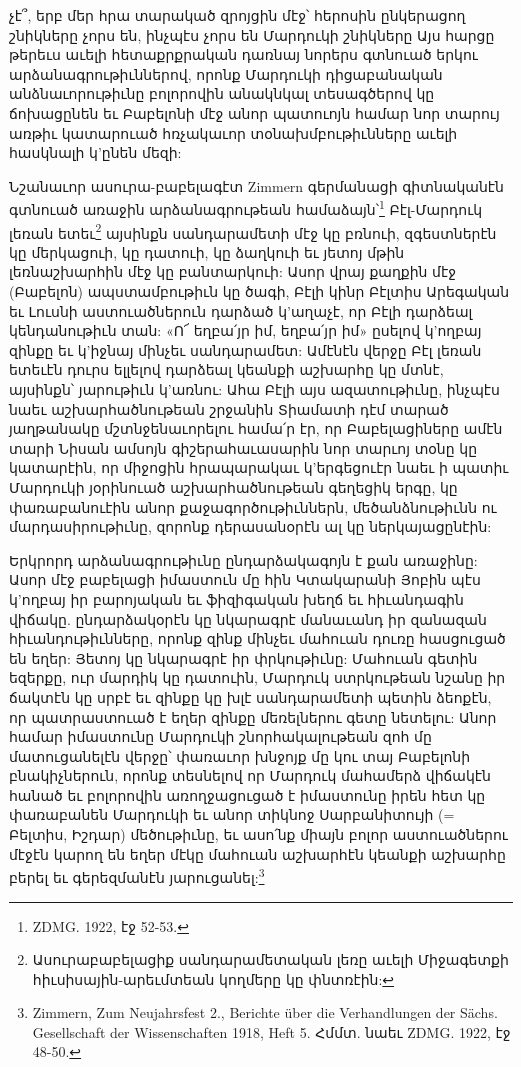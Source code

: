 \documentclass{article}
\begin{document}
{չէ՞, երբ մեր հրա տարակած զրոյցին մէջ՝ հերոսին ընկերացող շնիկները չորս են, ինչպէս չորս են Մարդուկի շնիկները Այս հարցը թերեւս աւելի հետաքրքրական դառնայ նորերս գտնուած երկու արձանագրութիւններով, որոնք Մարդուկի դիցաբանական անձնաւորութիւնը բոլորովին անակնկալ տեսագծերով կը ճոխացընեն եւ Բաբելոնի մէջ անոր պատուոյն համար նոր տարույ առթիւ կատարուած հռչակաւոր տօնախմբութիւնները աւելի հասկնալի կ'ընեն մեզի:

Նշանաւոր ասուրա-բաբելագէտ Zimmern գերմանացի գիտնականէն գտնուած առաջին արձանագրութեան համաձայն՝\footnote{ZDMG. 1922, էջ 52-53.} Բէլ-Մարդուկ լեռան ետեւ\footnote{Ասուրաբաբելացիք սանդարամետական լեռը աւելի Միջագետքի հիւսիսային-արեւմտեան կողմերը կը փնտռէին:} այսինքն սանդարամետի մէջ կը բռնուի, զգեստներէն կը մերկացուի, կը դատուի, կը ձաղկուի եւ յետոյ մթին լեռնաշխարհին մէջ կը բանտարկուի: Ասոր վրայ քաղքին մէջ (Բաբելոն) ապստամբութիւն կը ծագի, Բէլի կինր Բէլտիս Արեգական եւ Լուսնի աստուածներուն դարձած կ'աղաչէ, որ Բէլի դարձեալ կենդանութիւն տան: «Ո՜ եղբա՛յր իմ, եղբա՛յր իմ» ըսելով կ'ողբայ զինքը եւ կ'իջնայ մինչեւ սանդարամետ: Ամէնէն վերջը Բէլ լեռան ետեւէն դուրս ելլելով դարձեալ կեանքի աշխարհը կը մտնէ, այսինքն՝ յարութիւն կ'առնու: Ահա Բէլի այս ազատութիւնը, ինչպէս նաեւ աշխարհածնութեան շրջանին Տիամատի դէմ տարած յաղթանակը մշտնջենաւորելու համա՛ր էր, որ Բաբելացիները ամէն տարի Նիսան ամսոյն գիշերահաւասարին նոր տարւոյ տօնը կը կատարէին, որ միջոցին հրապարակաւ կ'երգեցուէր նաեւ ի պատիւ Մարդուկի յօրինուած աշխարհածնութեան գեղեցիկ երգը, կը փառաբանուէին անոր քաջագործութիւններն, մեծանձնութիւնն ու մարդասիրութիւնը, զորոնք դերասանօրէն ալ կը ներկայացընէին:

Երկրորդ արձանագրութիւնը ընդարձակագոյն է քան առաջինը: Ասոր մէջ բաբելացի իմաստուն մը հին Կտակարանի Յոբին պէս կ'ողբայ իր բարոյական եւ ֆիզիգական խեղճ եւ հիւանդագին վիճակը. ընդարձակօրէն կը նկարագրէ մանաւանդ իր զանազան հիւանդութիւնները, որոնք զինք մինչեւ մահուան դուռը հասցուցած են եղեր: Յետոյ կը նկարագրէ իր փրկութիւնը: Մահուան գետին եզերքը, ուր մարդիկ կը դատուին, Մարդուկ ստրկութեան նշանը իր ճակտէն կը սրբէ եւ զինքը կը խլէ սանդարամետի պետին ձեոքէն, որ պատրաստուած է եղեր զինքը մեռելներու գետը նետելու: Անոր համար իմաստունը Մարդուկի շնորհակալութեան զոհ մը մատուցանելէն վերջը՝ փառաւոր խնջոյք մը կու տայ Բաբելոնի բնակիչներուն, որոնք տեսնելով որ Մարդուկ մահամերձ վիճակէն հանած եւ բոլորովին առողջացուցած է իմաստունը իրեն հետ կը փառաբանեն Մարդուկի եւ անոր տիկնոջ Սարբանիտույի (= Բելտիս, Իշդար) մեծութիւնը, եւ ասո՛նք միայն բոլոր աստուածներու մէջէն կարող են եղեր մէկը մահուան աշխարհէն կեանքի աշխարհը բերել եւ գերեզմանէն յարուցանել:\footnote{Zimmern, Zum Neujahrsfest 2., Berichte über die Verhandlungen der Sächs. Gesellschaft der Wissenschaften 1918, Heft 5. Հմմտ. նաեւ ZDMG. 1922, էջ 48-50.}

}
\end{document}
